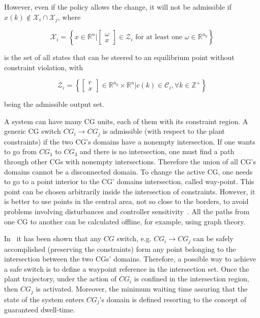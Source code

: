

However, even if the policy allows the change, it will not be admissible if
\(x(k)\not\in\mathcal{X}_i\cap{}\mathcal{X}_j\), where

\begin{equation}
	\mathcal{X}_i =
	\left\{
	x\in\mathbb{R}^n | \begin{bmatrix}\omega\\x\end{bmatrix} \in
	\mathcal{Z}_i \textrm{ for at least one } \omega\in\mathbb{R}^{n_y}
	\right\}
\end{equation}

is the set of all states that can be steered to an equilibrium point without
constraint violation, with

\begin{equation}
	\mathcal{Z}_i =
	\left\{
	\begin{bmatrix}r\\x\end{bmatrix}
	\in\mathbb{R}^{n_y}\times\mathbb{R}^{n} | c(k)\in\mathcal{C}_i,
	\forall{}k\in\mathbb{Z}^+
	\right\}
\end{equation}

being the admissible output set.

A system can have many CG units, each of them with its constraint region.  A
generic CG switch \(CG_i\rightarrow{}CG_j\) is admissible (with respect to the plant
constraints) if the two CG's domains have a nonempty intersection. If one wants
to go from \(CG_1\) to \(CG_3\) and there is no intersection, one must find a
path through other CGs with nonempty intersections. Therefore the union of all
CG's domains cannot be a disconnected domain. To change the active CG, one needs
to go to a point interior to the CG' domains intersection, called way-point.
This point can be chosen arbitrarily inside the intersection of constraints.
However, it is better to use points in the central area, not so close to the
borders, to avoid problems involving disturbances and controller
sensitivity~\citep{Keel1997}. All the paths from one CG to another can be
calculated offline, for example, using graph theory\citep{Ahuja1990,Pettie2004}.

In~\citep{Lucia2017,Franze2017} it has been shown that any \(CG\) switch, e.g.
\(CG_i\rightarrow{}CG_j\) can be safely accomplished (preserving the constraints) form any
point belonging to the intersection between the two CGs' domains. Therefore, a
possible way to achieve a safe switch is to define a waypoint reference in the
intersection set. Once the plant trajectory, under the action of \(CG_i\) is
confined in the intersection region, then \(CG_j\) is activated. Moreover, the
minimum waiting time assuring that the state of the system enters \(CG_j\)'s
domain is defined resorting to the concept of guaranteed dwell-time.

